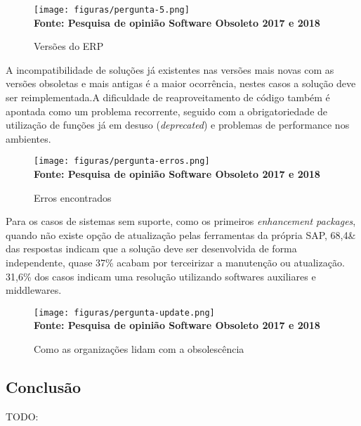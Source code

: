 \begin{figure}[ht]
	\centering	
	\caption[\hspace{0.1cm}Q1.]{Versões do ERP}
	\vspace{-0.4cm}
	\texttt{[image: figuras/pergunta-5.png]}
	\vspace{-0.2cm}
	\\\textbf{\footnotesize Fonte: Pesquisa de opinião Software Obsoleto 2017 e 2018 }	
	\label{fig:figura5}
\end{figure}
\vspace{-0.5cm}
\newpage
A incompatibilidade de soluções já existentes nas versões mais novas com as versões obsoletas e mais antigas é a maior ocorrência, nestes casos a solução deve ser reimplementada.A dificuldade de reaproveitamento de código também é apontada como um problema recorrente, seguido com a obrigatoriedade de utilização de funções já em desuso (\textit{deprecated}) e problemas de performance nos ambientes.

\begin{figure}[ht]
	\centering	
	\caption[\hspace{0.1cm}Q1.]{Erros encontrados}
	\vspace{-0.4cm}
	\texttt{[image: figuras/pergunta-erros.png]}
	\vspace{-0.2cm}
	\\\textbf{\footnotesize Fonte: Pesquisa de opinião Software Obsoleto 2017 e 2018 }	
	\label{fig:figura6}
\end{figure}

Para os casos de sistemas sem suporte, como os primeiros \textit{enhancement packages}, quando não existe opção de atualização pelas ferramentas da própria SAP,
68,4\& das respostas indicam que a solução deve ser desenvolvida de forma independente, quase 37\% acabam por terceirizar a manutenção ou atualização. 31,6\% dos casos indicam uma resolução utilizando softwares auxiliares e middlewares. 

\begin{figure}[ht]
	\centering	
	\caption[\hspace{0.1cm}Q1.]{Como as organizações lidam com a obsolescência}
	\vspace{-0.4cm}
	\texttt{[image: figuras/pergunta-update.png]}
	\vspace{-0.2cm}
	\\\textbf{\footnotesize Fonte: Pesquisa de opinião Software Obsoleto 2017 e 2018 }	
	\label{fig:figura7}
\end{figure}
\vspace{-0.5cm}

\subsection{\esp Conclusão}

TODO:
